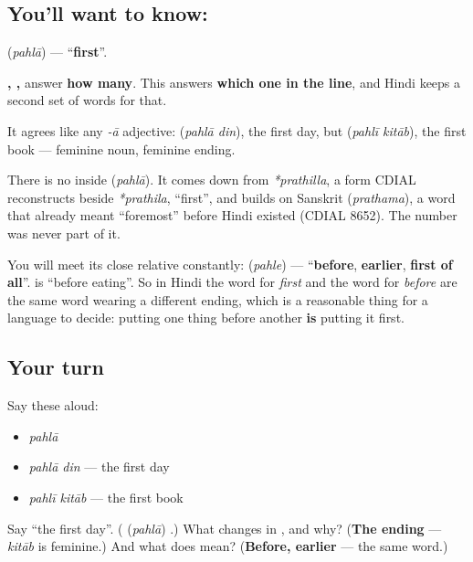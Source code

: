 \subsection*{You'll want to know: }
\textbf{} (\emph{pahlā}) — \textquotedblleft{}\textbf{first}\textquotedblright{}.

\textbf{, , } answer \textbf{how many}. This answers \textbf{which one in the line}, and Hindi keeps a second set of words for that.

It agrees like any \emph{-ā} adjective: \textbf{ } (\emph{pahlā din}), the first day, but \textbf{ } (\emph{pahlī kitāb}), the first book — feminine noun, feminine ending.

\begin{cousinweb}
There is no \textbf{} inside \textbf{} (\emph{pahlā}). It comes down from \emph{*prathilla}, a form CDIAL reconstructs beside \emph{*prathila}, \textquotedblleft{}first\textquotedblright{}, and builds on Sanskrit \textbf{} (\emph{prathama}), a word that already meant \textquotedblleft{}foremost\textquotedblright{} before Hindi existed (CDIAL 8652). The number was never part of it.

You will meet its close relative constantly: \textbf{} (\emph{pahle}) — \textquotedblleft{}\textbf{before}, \textbf{earlier}, \textbf{first of all}\textquotedblright{}. \emph{  } is \textquotedblleft{}before eating\textquotedblright{}. So in Hindi the word for \emph{first} and the word for \emph{before} are the same word wearing a different ending, which is a reasonable thing for a language to decide: putting one thing before another \textbf{is} putting it first.
\end{cousinweb}

\subsection*{Your turn}
Say these aloud:

\begin{itemize}
\raggedright
  \item \emph{pahlā}
  \item \emph{pahlā din} — the first day
  \item \emph{pahlī kitāb} — the first book
\end{itemize}

\begin{tcolorbox}[breakable,colback=teal!4,colframe=teal!35!black,title={Before you move on}]
Say \textquotedblleft{}the first day\textquotedblright{}. (\textbf{} (\emph{pahlā}) .) What changes in \emph{ }, and why? (\textbf{The ending} — \emph{kitāb} is feminine.) And what does \textbf{} mean? (\textbf{Before, earlier} — the same word.)
\end{tcolorbox}
